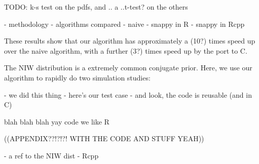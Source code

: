 \documentclass[english]{report}
\begin{document}
TODO: k-s test on the pdfs, and .. a ..t-test? on the others




- methodology
- algorithms compared
  - naive
  - snappy in R
  - snappy in Rcpp

These results show that our algorithm has approximately a (10?) times speed up over the naive algorithm, with a further (3?) times speed up by the port to C.


The NIW distribution is a extremely common conjugate prior. Here, we use our algorithm to rapidly do two simulation studies:




- we did this thing
- here's our test case
- and look, the code is reusable (and in C)


blah blah blah yay code we like R

((APPENDIX??!?!?! WITH THE CODE AND STUFF YEAH))

\newpage
{}

- a ref to the NIW dist
- Rcpp
\end{document}
